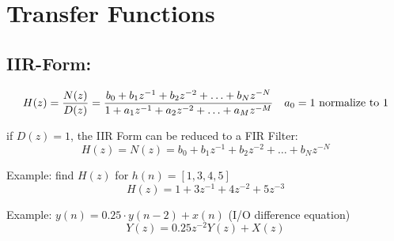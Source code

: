 \section{Transfer Functions}
\subsection{IIR-Form:}
\begin{align}
H(z) = \frac{N(z)}{D(z)}
		= \frac{b_0 + b_1 z^{-1} + b_2 z^{-2} + \ldots + b_N z^{-N}}{1 + a_1 z^{-1} + a_2 z^{-2} + \ldots + a_M z^{-M} } && a_0 = 1 \text{ normalize to } 1 \notag
\end{align}

if $D(z) = 1$, the IIR Form can be reduced to a FIR Filter:
\[
	H(z) = N(z) = b_0 + b_1 z^{-1} + b_2 z^{-2} + \ldots + b_N z^{-N}
\]

Example: find $H(z)$ for $h(n) = \left[1,3,4,5\right]$
\[ H(z) = 1 + 3z^{-1} + 4z^{-2} + 5z^{-3}\]

Example: $y(n) = 0.25 \cdot y(n-2) + x(n) $ \qquad (I/O difference equation)
\[
	Y(z) = 0.25z^{-2}Y(z) + X(z)
\]

